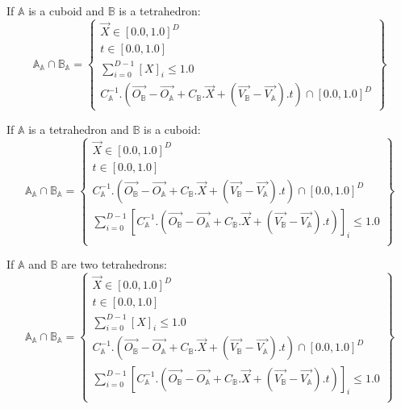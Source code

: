 \documentclass[12pt, a4paper]{article}
\begin{document}
If $\mathbb{A}$ is a cuboid and $\mathbb{B}$ is a tetrahedron:
\begin{equation}
\mathbb{A}_\mathbb{A}\cap\mathbb{B}_\mathbb{A}=\left\lbrace
\begin{array}{c}
\overrightarrow{X}\in[0.0,1.0]^D\\
t\in[0.0,1.0]\\
\sum_{i=0}^{D-1}\left[X\right]_i\le1.0\\
C_\mathbb{A}^{-1}.\left(\overrightarrow{O_\mathbb{B}}-\overrightarrow{O_\mathbb{A}}+C_\mathbb{B}.\overrightarrow{X}+\left(\overrightarrow{V_\mathbb{B}}-\overrightarrow{V_\mathbb{A}}\right).t\right)\cap[0.0,1.0]^D
\end{array}
\right\rbrace
\end{equation}

If $\mathbb{A}$ is a tetrahedron and $\mathbb{B}$ is a cuboid:
\begin{equation}
\mathbb{A}_\mathbb{A}\cap\mathbb{B}_\mathbb{A}=\left\lbrace
\begin{array}{c}
\overrightarrow{X}\in[0.0,1.0]^D\\
t\in[0.0,1.0]\\
C_\mathbb{A}^{-1}.\left(\overrightarrow{O_\mathbb{B}}-\overrightarrow{O_\mathbb{A}}+C_\mathbb{B}.\overrightarrow{X}+\left(\overrightarrow{V_\mathbb{B}}-\overrightarrow{V_\mathbb{A}}\right).t\right)\cap[0.0,1.0]^D\\
\sum_{i=0}^{D-1}\left[C_\mathbb{A}^{-1}.\left(\overrightarrow{O_\mathbb{B}}-\overrightarrow{O_\mathbb{A}}+C_\mathbb{B}.\overrightarrow{X}+\left(\overrightarrow{V_\mathbb{B}}-\overrightarrow{V_\mathbb{A}}\right).t\right)\right]_i\le1.0\\
\end{array}
\right\rbrace
\end{equation}

If $\mathbb{A}$ and $\mathbb{B}$ are two tetrahedrons:
\begin{equation}
\mathbb{A}_\mathbb{A}\cap\mathbb{B}_\mathbb{A}=\left\lbrace
\begin{array}{c}
\overrightarrow{X}\in[0.0,1.0]^D\\
t\in[0.0,1.0]\\
\sum_{i=0}^{D-1}\left[X\right]_i\le1.0\\
C_\mathbb{A}^{-1}.\left(\overrightarrow{O_\mathbb{B}}-\overrightarrow{O_\mathbb{A}}+C_\mathbb{B}.\overrightarrow{X}+\left(\overrightarrow{V_\mathbb{B}}-\overrightarrow{V_\mathbb{A}}\right).t\right)\cap[0.0,1.0]^D\\
\sum_{i=0}^{D-1}\left[C_\mathbb{A}^{-1}.\left(\overrightarrow{O_\mathbb{B}}-\overrightarrow{O_\mathbb{A}}+C_\mathbb{B}.\overrightarrow{X}+\left(\overrightarrow{V_\mathbb{B}}-\overrightarrow{V_\mathbb{A}}\right).t\right)\right]_i\le1.0\\
\end{array}
\right\rbrace
\end{equation}
\end{document}
